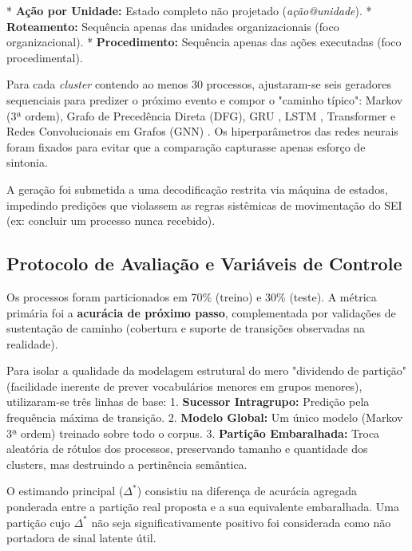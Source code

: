 * \textbf{Ação por Unidade:} Estado completo não projetado (\emph{ação@unidade}).
* \textbf{Roteamento:} Sequência apenas das unidades organizacionais (foco organizacional).
* \textbf{Procedimento:} Sequência apenas das ações executadas (foco procedimental).

Para cada \emph{cluster} contendo ao menos 30 processos, ajustaram-se seis geradores sequenciais para predizer o próximo evento e compor o "caminho típico": Markov (3ª ordem), Grafo de Precedência Direta (DFG), GRU \cite{cho2014gru}, LSTM \cite{hochreiter1997lstm}, Transformer \cite{vaswani2017attention} e Redes Convolucionais em Grafos (GNN) \cite{kipf2017gcn}. Os hiperparâmetros das redes neurais foram fixados para evitar que a comparação capturasse apenas esforço de sintonia.

A geração foi submetida a uma decodificação restrita via máquina de estados, impedindo predições que violassem as regras sistêmicas de movimentação do SEI (ex: concluir um processo nunca recebido).

\subsection{Protocolo de Avaliação e Variáveis de Controle}\label{sec:protocolo}

Os processos foram particionados em 70\% (treino) e 30\% (teste). A métrica primária foi a \textbf{acurácia de próximo passo}, complementada por validações de sustentação de caminho (cobertura e suporte de transições observadas na realidade). 

Para isolar a qualidade da modelagem estrutural do mero "dividendo de partição" (facilidade inerente de prever vocabulários menores em grupos menores), utilizaram-se três linhas de base:
1. \textbf{Sucessor Intragrupo:} Predição pela frequência máxima de transição.
2. \textbf{Modelo Global:} Um único modelo (Markov 3ª ordem) treinado sobre todo o corpus.
3. \textbf{Partição Embaralhada:} Troca aleatória de rótulos dos processos, preservando tamanho e quantidade dos clusters, mas destruindo a pertinência semântica. 

O estimando principal ($\Delta^*$) consistiu na diferença de acurácia agregada ponderada entre a partição real proposta e a sua equivalente embaralhada. Uma partição cujo $\Delta^*$ não seja significativamente positivo foi considerada como não portadora de sinal latente útil.
